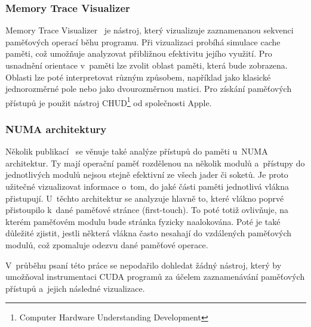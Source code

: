 \subsubsection*{Memory Trace Visualizer}
Memory Trace Visualizer~\cite{mtv} je nástroj, který vizualizuje zaznamenanou sekvenci paměťových operací běhu programu. Při vizualizaci probíhá simulace cache paměti, což umožňuje analyzovat přibližnou efektivitu jejího využití. Pro usnadnění orientace v~paměti lze zvolit oblast paměti, která bude zobrazena. Oblasti lze poté interpretovat různým způsobem, například jako klasické jednorozměrné pole nebo jako dvourozměrnou matici. Pro získání paměťových přístupů je použit nástroj CHUD\footnote{Computer Hardware Understanding Development} od společnosti Apple.

\subsubsection*{NUMA architektury}
Několik publikací~\cite{numa-visualisation, numa-tabarnac} se věnuje také analýze přístupů do paměti u~NUMA architektur. Ty mají operační paměť rozdělenou na několik modulů a~přístupy do jednotlivých modulů nejsou stejně efektivní ze všech jader či soketů. Je proto užitečné vizualizovat informace o~tom, do jaké části paměti jednotlivá vlákna přistupují. U~těchto architektur se analyzuje hlavně to, které vlákno poprvé přistoupilo k~dané paměťové stránce (first-touch). To poté totiž ovlivňuje, na kterém paměťovém modulu bude stránka fyzicky naalokována. Poté je také důležité zjistit, jestli některá vlákna často nesahají do vzdálených paměťových modulů, což zpomaluje odezvu dané paměťové operace.

V~průběhu psaní této práce se nepodařilo dohledat žádný nástroj, který by umožňoval instrumentaci CUDA programů za účelem zaznamenávání paměťových přístupů a~jejich následné vizualizace.
